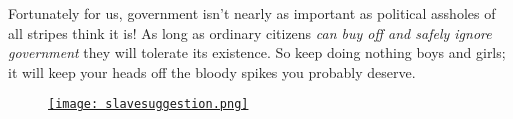 Fortunately for us, government isn't nearly as important as political
assholes of all stripes think it is! As long as ordinary citizens
\emph{can buy off and safely ignore government} they will tolerate its
existence. So keep doing nothing boys and girls; it will keep your heads
off the bloody spikes you probably deserve.

\captionsetup[figure]{labelformat=empty}
\begin{figure}[htbp]
\centering
\href{http://www.vulgartrader.com/post/101808677710}{\texttt{[image: slavesuggestion.png]}}
\label{fig:4860X1}
\end{figure}






%